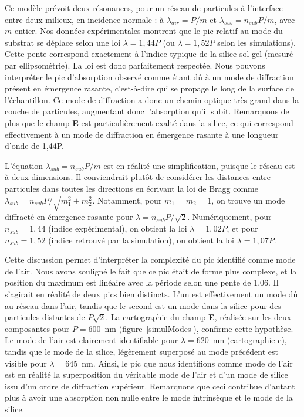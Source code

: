 Ce modèle prévoit deux résonances, pour un réseau de particules à l'interface entre deux milieux, en incidence normale : à $\lambda_{air} = P/m$ et $\lambda_{sub} = n_{sub}P/m$, avec $m$ entier. Nos données expérimentales montrent que le pic relatif au mode du substrat se déplace selon une loi $\lambda = 1,44P $ (ou $\lambda = 1, 52P$ selon les simulations). Cette pente correspond exactement à l'indice typique de la silice sol-gel (mesuré par ellipsométrie). La loi est donc parfaitement respectée. Nous pouvons interpréter le pic d'absorption observé comme étant dû à un mode de diffraction présent en émergence rasante, c'est-à-dire qui se propage le long de la surface de l'échantillon. Ce mode de diffraction a donc un chemin optique très grand dans la couche de particules, augmentant donc l'absorption qu'il subit. Remarquons de plus que le champ \textbf{E} est particulièrement exalté dans la silice, ce qui correspond effectivement à un mode de diffraction en émergence rasante à une longueur d'onde de 1,44P.\par 
L'équation $\lambda_{sub} = n_{sub}P/m$ est en réalité une simplification, puisque le réseau est à deux dimensions. Il conviendrait plutôt de considérer les distances entre particules dans toutes les directions en écrivant la loi de Bragg comme $\lambda_{sub} = n_{sub}P/\sqrt{m_1^2+m_2^2}$. Notamment, pour $m_1=m_2=1$, on trouve un mode diffracté en émergence rasante pour $\lambda = n_{sub}P/\sqrt{2}$. Numériquement, pour $n_{sub}=1,44$ (indice expérimental), on obtient la loi $\lambda = 1,02 P$, et pour $n_{sub}=1,52$ (indice retrouvé par la simulation), on obtient la loi $\lambda = 1,07 P$.\par 
Cette discussion permet d'interpréter la complexité du pic identifié comme mode de l'air. Nous avons souligné le fait que ce pic était de forme plus complexe, et la position du maximum est linéaire avec la période selon une pente de 1,06. Il s'agirait en réalité de deux pics bien distincts. L'un est effectivement un mode dû au réseau dans l'air, tandis que le second est un mode dans la silice pour des particules distantes de $P\sqrt{2}$. La cartographie du champ \textbf{E}, réalisée sur les deux composantes pour $P = 600$~nm (figure~\ref{simulModes}), confirme cette hypothèse. Le mode de l'air est clairement identifiable pour $\lambda = 620$~nm (cartographie c), tandis que le mode de la silice, légèrement superposé au mode précédent est visible pour $\lambda = 645$~nm. Ainsi, le pic que nous identifions comme \og mode de l'air \fg{} est en réalité la superposition du véritable mode de l'air et d'un mode de silice issu d'un ordre de diffraction supérieur. Remarquons que ceci contribue d'autant plus à avoir une absorption non nulle entre le mode intrinsèque et le mode de la silice.\par 

